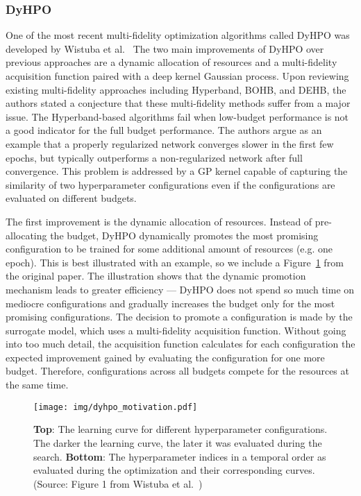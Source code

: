 \subsubsection{DyHPO}
One of the most recent multi-fidelity optimization algorithms called DyHPO was developed by Wistuba et al.~\cite{wistuba2022supervising} The two main improvements of DyHPO over previous approaches are a dynamic allocation of resources and a multi-fidelity acquisition function paired with a deep kernel Gaussian process. Upon reviewing existing multi-fidelity approaches including Hyperband, BOHB, and DEHB, the authors stated a conjecture that these multi-fidelity methods suffer from a major issue. The Hyperband-based algorithms fail when low-budget performance is not a good indicator for the full budget performance. The authors argue as an example that a properly regularized network converges slower in the first few epochs, but typically outperforms a non-regularized network after full convergence. This problem is addressed by a GP kernel capable of capturing the similarity of two hyperparameter configurations even if the configurations are evaluated on different budgets.

The first improvement is the dynamic allocation of resources. Instead of pre-allocating the budget, DyHPO dynamically promotes the most promising configuration to be trained for some additional amount of resources (e.g. one epoch). This is best illustrated with an example, so we include a Figure~\ref{fig:dyhpo_motivation} from the original paper. The illustration shows that the dynamic promotion mechanism leads to greater efficiency --- DyHPO does not spend so much time on mediocre configurations and gradually increases the budget only for the most promising configurations. The decision to promote a configuration is made by the surrogate model, which uses a multi-fidelity acquisition function. Without going into too much detail, the acquisition function calculates for each configuration the expected improvement gained by evaluating the configuration for one more budget. Therefore, configurations across all budgets compete for the resources at the same time.

\begin{figure}
    \centering
    \texttt{[image: img/dyhpo\_motivation.pdf]}
    \caption{\textbf{Top}: The learning curve for different hyperparameter configurations. The darker the learning curve, the later it was evaluated during the search. \textbf{Bottom}: The hyperparameter indices in a temporal order as evaluated during the optimization and their corresponding curves. (Source: Figure 1 from Wistuba et al.~\cite{wistuba2022supervising})}
    \label{fig:dyhpo_motivation}
\end{figure}

